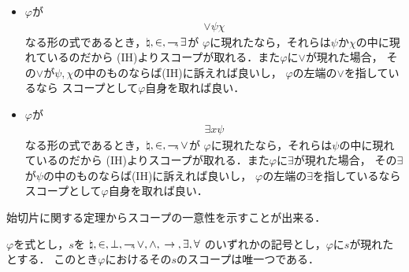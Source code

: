 \begin{metaprf}
\begin{description}
\begin{itemize}
					\item $\varphi$が
						\begin{align}
							\vee \psi \chi
						\end{align}
						なる形の式であるとき，$\natural,\in,\rightharpoondown\hspace{-0.25em},\exists$が
						$\varphi$に現れたなら，それらは$\psi$か$\chi$の中に現れているのだから
						(IH)よりスコープが取れる．また$\varphi$に$\vee$が現れた場合，
						その$\vee$が$\psi,\chi$の中のものならば(IH)に訴えれば良いし，
						$\varphi$の左端の$\vee$を指しているなら
						スコープとして$\varphi$自身を取れば良い．
						
					\item $\varphi$が
						\begin{align}
							\exists x \psi
						\end{align}
						なる形の式であるとき，$\natural,\in,\rightharpoondown\hspace{-0.25em},\vee$が
						$\varphi$に現れたなら，それらは$\psi$の中に現れているのだから
						(IH)よりスコープが取れる．また$\varphi$に$\exists$が現れた場合，
						その$\exists$が$\psi$の中のものならば(IH)に訴えれば良いし，
						$\varphi$の左端の$\exists$を指しているなら
						スコープとして$\varphi$自身を取れば良い．
						\QED
				\end{itemize}
		\end{description}
	\end{metaprf}
	
	始切片に関する定理からスコープの一意性を示すことが出来る．
	
	\begin{screen}
		\begin{metathm}[スコープの一意性]\label{metathm:uniqueness_of_scopes_L_in}
			$\varphi$を式とし，$s$を
			$\natural,\in,\bot,\rightharpoondown\hspace{-0.25em},\vee,\wedge,\hspace{0.25em}\rightarrow\hspace{0.25em},\exists,\forall$
			のいずれかの記号とし，$\varphi$に$s$が現れたとする．
			このとき$\varphi$におけるその$s$のスコープは唯一つである．
		\end{metathm}
	\end{screen}
	
